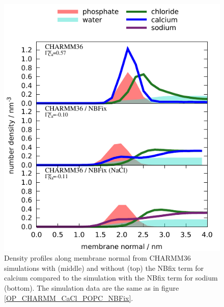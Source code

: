 \documentclass[journal=jpcbfk]{achemso}
\begin{document}
\begin{figure}[]
  \centering
  \includegraphics[width=17.0cm]{../Figs/density_profile_CHARMM_CaCl_POPC_NBFix.pdf}
  \caption{\label{density_profile_CHARMM_CaCl_POPC_NBFix}
    Density profiles along membrane normal from CHARMM36 simulations with (middle)
    and without (top) the NBfix term for calcium \cite{kim16} compared to the simulation
    with the NBfix term for sodium \cite{venable13} (bottom). The simulation data are the same as in figure \ref{OP_CHARMM_CaCl_POPC_NBFix}.
  }
\end{figure}


\clearpage
\end{document}
